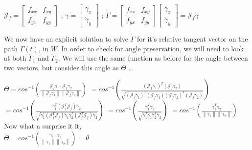 \documentclass[a4paper,man,natbib]{apa6}
\begin{document}
\begin{center}

      $ \mathcal{J}_f = \begin{bmatrix}
        f_{xx} & f_{xy}\\
        f_{yx} & f_{yy}
        \end{bmatrix} $ ;
      $ \dot{\gamma} = \begin{bmatrix}
        \dot{\gamma}_x\\
        \dot{\gamma}_y
        \end{bmatrix} $ ;
      $ \dot{\Gamma} = \begin{bmatrix}
        f_{xx} & f_{xy}\\
        f_{yx} & f_{yy}
        \end{bmatrix}
        \begin{bmatrix}
        \dot{\gamma}_x\\
        \dot{\gamma}_y
        \end{bmatrix}
        = \mathcal{J}_f\dot{\gamma}$

\end{center}

We now have an explicit solution to solve $ \dot{\Gamma} $ for it's relative tangent vector on the path $ \Gamma(t) $, in $ W $.
In order to check for angle preservation, we will need to look at both $ \dot{\Gamma}_1 $ and $ \dot{\Gamma}_2 $.
We will use the same function as before for the angle between two vectors, but consider this angle as $ \Theta $ \dots

\begin{center}

      $ \Theta = cos^{-1}(\frac{\mathcal{J}_f\dot{\gamma}_1 \cdot \mathcal{J}_f\dot{\gamma}_2}{{\left\lVert \mathcal{J}_f\dot{\gamma}_1 \right\rVert \left\lVert \mathcal{J}_f\dot{\gamma}_2  \right\rVert }}) $
      $ = cos^{-1}(\frac{(\mathcal{J}_f\dot{\gamma}_1)^T(\mathcal{J}_f\dot{\gamma}_2)}{\sqrt{{(\mathcal{J}_f\dot{\gamma}_1)^T(\mathcal{J}_f\dot{\gamma}_1)(\mathcal{J}_f\dot{\gamma}_2)^T(\mathcal{J}_f\dot{\gamma}_2)}}})$
      $ = cos^{-1}(\frac{\dot{\gamma}_1^T(\mathcal{J}_f^T\mathcal{J}_f)\dot{\gamma}_2}{\sqrt{\dot{\gamma}_1^T(\mathcal{J}_f^T\mathcal{J}_f)\dot{\gamma}_1\dot{\gamma}_2^T(\mathcal{J}_f^T\mathcal{J}_f)\dot{\gamma}_2}})$
      $ = cos^{-1}(\frac{\dot{\gamma}_1^T\dot{\gamma}_2}{\sqrt{\dot{\gamma}_1^T\dot{\gamma}_1\dot{\gamma}_2^T\dot{\gamma}_2}})$
      $ = cos^{-1}(\frac{\dot{\gamma}_1^T\dot{\gamma}_2}{\left\lVert \dot{\gamma}_1 \right\rVert \left\lVert \dot{\gamma}_2  \right\rVert })$ \\
      Now what a surprise it it, \\
      $ \Theta = cos^{-1}(\frac{\dot{\gamma}_1  \cdot \dot{\gamma}_2 }{\left\lVert \dot{\gamma}_1 \right\rVert \left\lVert \dot{\gamma}_2  \right\rVert }) = \theta $

\end{center}
\end{document}
